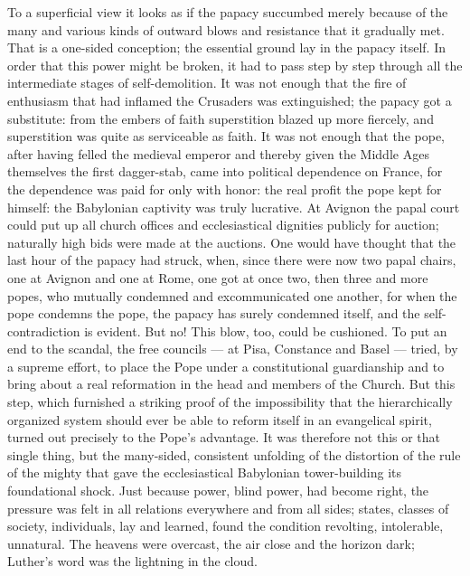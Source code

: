 \documentclass[12pt,a4paper,openany]{book}
\newcommand{\opage}[1]{\marginnote{\footnotesize\textit{[#1]}}}
\begin{document}
To a superficial view it looks as if
the papacy succumbed merely because of the many
and various kinds of outward blows and resistance that it gradually
met. That is a one-sided conception; the essential
ground lay in the papacy itself. In order that this
power might be broken, it had to pass step by step through
all the intermediate stages of self-demolition. It was not enough that
the fire of enthusiasm that had inflamed the Crusaders
was extinguished; the papacy got a substitute: from the embers of faith
superstition blazed up more fiercely, and superstition was
quite as serviceable as faith. It was not enough that the pope, after
having felled the medieval emperor and thereby given
the Middle Ages themselves the first dagger-stab, came into political
dependence on France, for the dependence was
paid for only with honor: the real profit the pope kept
for himself: the Babylonian captivity was truly lucrative.
At Avignon the papal court could put up all church offices
and ecclesiastical dignities publicly for auction;
naturally high bids were made at the auctions.
One would have thought that the last hour of the papacy had struck,
when, since there were now two papal chairs, one at Avignon
and one at Rome, one got at once two, then three and more popes,
who mutually condemned and excommunicated one another, for when
the pope condemns the pope, the papacy has surely condemned
itself, and the self-contradiction is evident. But no!
\setcounter{footnote}{0}%
\opage{304}This blow, too, could be cushioned. To put an end to the scandal, the free councils --- at Pisa,
Constance and Basel --- tried, by a supreme effort, to
place the Pope under a constitutional guardianship
and to bring about a real reformation in the head and members of the Church. But this step, which furnished a striking
proof of the impossibility that the hierarchically organized
system should ever be able to reform itself
in an evangelical spirit, turned out precisely to the Pope's advantage.
It was therefore not this or that single thing, but the
many-sided, consistent unfolding of the distortion of the rule of the mighty
that gave the ecclesiastical Babylonian tower-building
its foundational shock. Just because power, blind power,
had become right, the pressure was felt in all relations everywhere
and from all sides; states, classes of society, individuals, lay
and learned, found the condition revolting, intolerable, unnatural.
The heavens were overcast, the air close and the horizon
dark; Luther's word was the lightning in the cloud.
\end{document}
